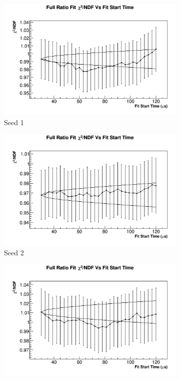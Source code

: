 \begin{figure}[]
\centering
    \begin{subfigure}[t]{0.45\textwidth}
	    \centering
		\includegraphics[width=\textwidth]{RatioCBO_Chi2NDF_Vs_FS_canv-Seed0}
	    \caption{Seed 1}
    \end{subfigure}
    \begin{subfigure}[t]{0.45\textwidth}
	    \centering
		\includegraphics[width=\textwidth]{RatioCBO_Chi2NDF_Vs_FS_canv-Seed5}
	    \caption{Seed 2}
    \end{subfigure}%
    \vspace{4mm}
    \begin{subfigure}[t]{0.45\textwidth}
	    \centering
		\includegraphics[width=\textwidth]{RatioCBO_Chi2NDF_Vs_FS_canv-Seed12}

\end{subfigure}
\end{figure}
